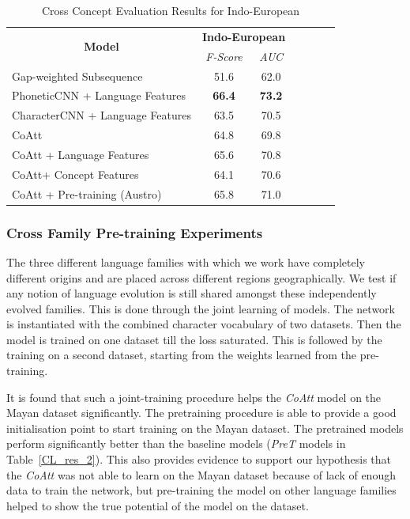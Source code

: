 \documentclass[11pt,letterpaper]{article}
\begin{document}
\begin{table}[t]
\centering
\begin{tabular}{lcccccc}
\multicolumn{1}{c}{\multirow{2}{*}{\textbf{Model}}} & \multicolumn{2}{c}{\textbf{Indo-European}} \\ \cline{2-3} 
\multicolumn{1}{c}{}                                & \textit{F-Score}      & \textit{AUC}    \\ \hline
Gap-weighted Subsequence                            & 51.6                  & 62.0            \\ \hline
PhoneticCNN + Language Features                     & \textbf{66.4}         & \textbf{73.2}   \\
CharacterCNN + Language Features                    & 63.5                  & 70.5            \\ \hline
CoAtt                                               & 64.8                  & 69.8            \\
CoAtt + Language Features                           & 65.6                  & 70.8            \\
CoAtt+ Concept Features                             & 64.1                  & 70.6            \\
CoAtt + Pre-training (Austro)                       & 65.8                  & 71.0 
\end{tabular}
\label{CC_res}
\caption{Cross Concept Evaluation Results for Indo-European}
\end{table}

\subsubsection*{Cross Family Pre-training Experiments}

The three different language families with which we work have completely different origins and are placed across different regions geographically. We test if any notion of language evolution is still shared amongst these independently evolved families. This is done through the joint learning of models. The network is instantiated with the combined character vocabulary of two datasets. Then the model is trained on one dataset till the loss saturated. This is followed by the training on a second dataset, starting from the weights learned from the pre-training. 

It is found that such a joint-training procedure helps the \textit{CoAtt} model on the Mayan dataset significantly. The pretraining procedure is able to provide a good initialisation point to start training on the Mayan dataset. The pretrained models perform significantly better than the baseline models (\textit{PreT} models in Table~\ref{CL_res_2}). This also provides evidence to support our hypothesis that the \textit{CoAtt} was not able to learn on the Mayan dataset because of lack of enough data to train the network, but pre-training the model on other language families helped to show the true potential of the model on the dataset.
\end{document}
